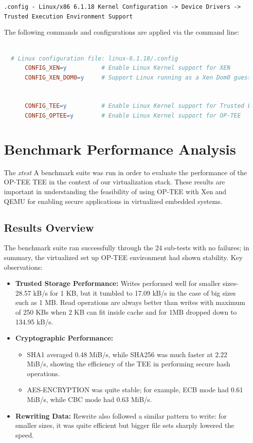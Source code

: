 \documentclass[acmtog]{acmart}
\begin{document}
\texttt{.config - Linux/x86 6.1.18 Kernel Configuration -> Device Drivers -> Trusted Execution Environment Support}

The following commands and configurations are applied via the command line:
\begin{lstlisting}[language=make, caption=Enabling OP-TEE in the Linux Kernel Configuration]
 
  # Linux configuration file: linux-6.1.18/.config
      CONFIG_XEN=y          # Enable Linux Kernel support for XEN
      CONFIG_XEN_DOM0=y     # Support Linux running as a Xen Dom0 guest

      
      CONFIG_TEE=y          # Enable Linux Kernel support for Trusted Execution Environment (TEE) 
      CONFIG_OPTEE=y        # Enable Linux Kernel support for OP-TEE
\end{lstlisting}


\section{Benchmark Performance Analysis}

The \textit{xtest} A benchmark suite was run in order to evaluate the performance of the OP-TEE TEE in the context of our virtualization stack. These results are important in understanding the feasibility of using OP-TEE with Xen and QEMU for enabling secure applications in virtualized embedded systems.

\subsection{Results Overview}
The benchmark suite ran successfully through the 24 sub-tests with no failures; in summary, the virtualized set up OP-TEE environment had shown stability. Key observations:

\begin{itemize}
    \item \textbf{Trusted Storage Performance:} Writes performed well for smaller sizes-28.57 kB/s for 1 KB, but it tumbled to 17.09 kB/s in the case of big sizes such as 1 MB. Read operations are always better than writes with maximum of 250 KBs when 2 KB can fit inside cache and for 1MB dropped down to 134.95 kB/s.
    \item \textbf{Cryptographic Performance:} 
    \begin{itemize}
        \item SHA1 averaged 0.48 MiB/s, while SHA256 was much faster at 2.22 MiB/s, showing the efficiency of the TEE in performing secure hash operations.
        \item AES-ENCRYPTION was quite stable; for example, ECB mode had 0.61 MiB/s, while CBC mode had 0.63 MiB/s.
    \end{itemize}
    \item \textbf{Rewriting Data:} Rewrite also followed a similar pattern to write: for smaller sizes, it was quite efficient but bigger file sets sharply lowered the speed.
\end{itemize}
\end{document}
